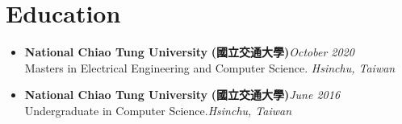 \section{\sectionheading Education}

\begin{itemize}[leftmargin=0pt, label={}]%

\item{
{\sectionheading\large{\textbf{National Chiao Tung University}}} \textbf{(國立交通大學)}\hfill {\sectionheading\small{\textit{October 2020}}}\\
{\sectionheading\small{Masters in Electrical Engineering and Computer Science.}}\hfill 
{\sectionheading\small{\textit{Hsinchu, Taiwan}}}

}
\item{
{\sectionheading\large{\textbf{National Chiao Tung University}}} \textbf{(國立交通大學)}\hfill {\sectionheading\small{\textit{June 2016}}}\\
{\sectionheading\small{Undergraduate in Computer Science.}}\hfill {\sectionheading\small{\textit{Hsinchu, Taiwan}}}

}

\end{itemize}
